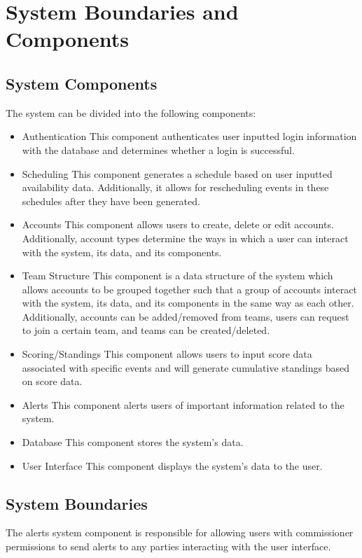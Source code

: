 \documentclass{article}
\begin{document}
\section{System Boundaries and Components}

\subsection{System Components}
The system can be divided into the following components:
\begin{itemize}
    \item Authentication
    \subitem This component authenticates user inputted login information with the database
    and determines whether a login is successful.
    \item Scheduling
    \subitem This component generates a schedule based on user inputted availability data. 
    Additionally, it allows for rescheduling events in these schedules after they 
    have been generated.
    \item Accounts
    \subitem This component allows users to create, delete or edit accounts. Additionally, account types 
    determine the ways in which a user can interact with the system, its data, and its components.
    \item Team Structure
    \subitem This component is a data structure of the system which allows accounts to be grouped together 
    such that a group of accounts interact with the system, its data, and its components in the same way as 
    each other. Additionally, accounts can be added/removed from teams, users can request to join a 
    certain team, and teams can be created/deleted.
    \item Scoring/Standings
    \subitem This component allows users to input score data associated with specific events and will 
    generate cumulative standings based on score data.
    \item Alerts
    \subitem This component alerts users of important information related to the system.
    \item Database
    \subitem This component stores the system's data.
    \item User Interface
    \subitem This component displays the system's data to the user.
\end{itemize}

\subsection{System Boundaries}
The alerts system component is responsible for allowing users with commissioner
permissions to send alerts to any parties interacting with the user interface.
\end{document}
